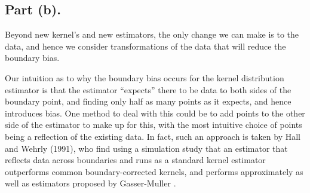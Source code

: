 \documentclass{article}
\begin{document}
\subsection{Part (b).}
Beyond new kernel's and new estimators, the only change we can make is to the data, and hence we consider transformations of the data that will reduce the boundary bias. 

Our intuition as to why the boundary bias occurs for the kernel distribution estimator is that the estimator ``expects'' there to be data to both sides of the boundary point, and finding only half as many points as it expects, and hence introduces bias. One method to deal with this could be to add points to the other side of the estimator to make up for this, with the most intuitive choice of points being a reflection of the existing data. In fact, such an approach is taken by Hall and Wehrly (1991), who find using a simulation study that an estimator that reflects data across boundaries and runs as a standard kernel estimator outperforms common boundary-corrected kernels, and performs approximately as well as estimators proposed by Gasser-Muller \cite{hall1991}.
\end{document}
